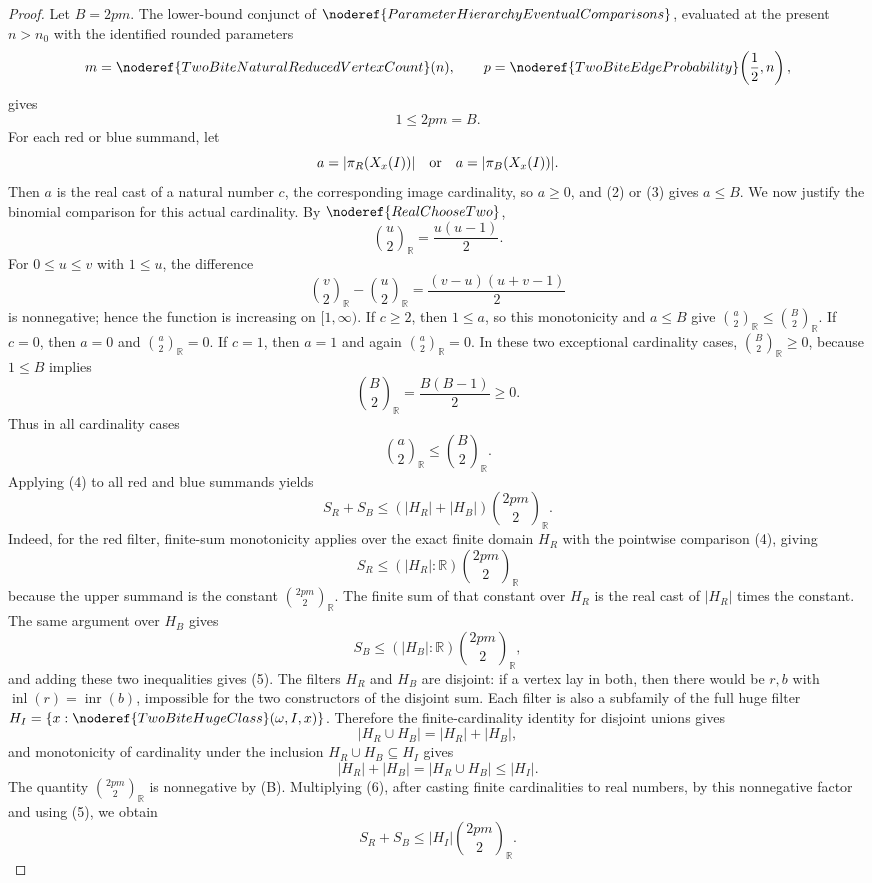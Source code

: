 \begin{proof}
Let \(B=2pm\).  The lower-bound conjunct of
\(\noderef{ParameterHierarchyEventualComparisons}\), evaluated at the present
\(n>n_0\) with the identified rounded parameters
\[
m=\noderef{TwoBiteNaturalReducedVertexCount}(n),\qquad
p=\noderef{TwoBiteEdgeProbability}\!\left(\frac12,n\right),
\]
gives
\[
1\le2pm=B. \tag{B}
\]
For each red or blue
summand, let
\[
a=|\pi_R(X_x(I))|\quad\hbox{or}\quad a=|\pi_B(X_x(I))|.
\]
Then \(a\) is the real cast of a natural number \(c\), the corresponding image
cardinality, so \(a\ge0\), and (2) or (3) gives \(a\le B\).  We now justify
the binomial comparison for this actual cardinality.  By
\(\noderef{RealChooseTwo}\),
\[
\binom{u}{2}_{\mathbb R}=\frac{u(u-1)}2.
\]
For \(0\le u\le v\) with \(1\le u\), the difference
\[
\binom{v}{2}_{\mathbb R}-\binom{u}{2}_{\mathbb R}
  =\frac{(v-u)(u+v-1)}2
\]
is nonnegative; hence the function is increasing on \([1,\infty)\).  If
\(c\ge2\), then \(1\le a\), so this monotonicity and \(a\le B\) give
\(\binom a2_{\mathbb R}\le\binom B2_{\mathbb R}\).  If \(c=0\), then
\(a=0\) and \(\binom a2_{\mathbb R}=0\).  If \(c=1\), then \(a=1\) and again
\(\binom a2_{\mathbb R}=0\).  In these two exceptional cardinality cases,
\(\binom B2_{\mathbb R}\ge0\), because \(1\le B\) implies
\[
\binom B2_{\mathbb R}=\frac{B(B-1)}2\ge0.
\]
Thus in all cardinality cases
\[
\binom{a}{2}_{\mathbb R}\le \binom{B}{2}_{\mathbb R}. \tag{4}
\]
Applying (4) to all red and blue summands yields
\[
S_R+S_B
\le (|H_R|+|H_B|)\binom{2pm}{2}_{\mathbb R}. \tag{5}
\]
Indeed, for the red filter, finite-sum monotonicity applies over the exact
finite domain \(H_R\) with the pointwise comparison (4), giving
\[
S_R\le (|H_R|:\mathbb R)\binom{2pm}{2}_{\mathbb R}
\]
because the upper summand is the constant
\(\binom{2pm}{2}_{\mathbb R}\).  The finite sum of that constant over \(H_R\)
is the real cast of \(|H_R|\) times the constant.  The same argument over
\(H_B\) gives
\[
S_B\le (|H_B|:\mathbb R)\binom{2pm}{2}_{\mathbb R},
\]
and adding these two inequalities gives (5).
The filters \(H_R\) and \(H_B\) are disjoint: if a vertex lay in both, then
there would be \(r,b\) with
\(\operatorname{inl}(r)=\operatorname{inr}(b)\), impossible for the two
constructors of the disjoint sum.  Each filter is also a subfamily of the full
huge filter \(H_I=\{x:\noderef{TwoBiteHugeClass}(\omega,I,x)\}\).  Therefore
the finite-cardinality identity for disjoint unions gives
\[
|H_R\cup H_B|=|H_R|+|H_B|,
\]
and monotonicity of cardinality under the inclusion
\(H_R\cup H_B\subseteq H_I\) gives
\[
|H_R|+|H_B|=|H_R\cup H_B|\le |H_I|. \tag{6}
\]
The quantity \(\binom{2pm}{2}_{\mathbb R}\) is nonnegative by (B).
Multiplying (6), after casting finite cardinalities to real numbers, by this
nonnegative factor and using (5), we obtain
\[
S_R+S_B
\le |H_I|\binom{2pm}{2}_{\mathbb R}. \tag{7}
\]


\end{proof}

